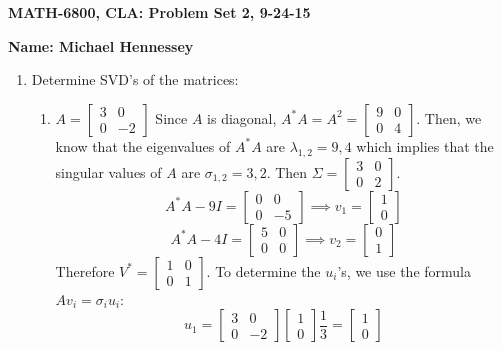 \documentclass[12pt]{article}
\numberwithin{equation}{section}
\begin{document}
{\large\bf MATH-6800, CLA: Problem Set 2, 9-24-15}



\vspace{6 ex}

{\bf Name: Michael Hennessey} \hfill

\vspace{6 ex}

\begin{enumerate}
\item Determine SVD's of the matrices:
    \begin{enumerate}
    \item $A=\left[\begin{array}{cc}3&0\\0&-2\end{array}\right]$
    Since $A$ is diagonal, $A^*A=A^2=\left[\begin{array}{cc}9&0\\0&4\end{array}\right]$. Then, we know that the eigenvalues of $A^*A$ are $\lambda_{1,2}=9,4$ which implies that the singular values of $A$ are $\sigma_{1,2}=3,2$. Then $\Sigma=\left[\begin{array}{cc}3&0\\0&2\end{array}\right]$.
    $$A^*A-9I=\left[\begin{array}{cc}0&0\\0&-5\end{array}\right]\implies v_1=\left[\begin{array}{c}1\\0\end{array}\right]$$
    $$A^*A-4I=\left[\begin{array}{cc}5&0\\0&0\end{array}\right]\implies v_2=\left[\begin{array}{c}0\\1\end{array}\right]$$
    Therefore $V^*=\left[\begin{array}{cc}1&0\\0&1\end{array}\right]$. To determine the $u_i$'s, we use the formula $Av_i=\sigma_iu_i$:
    $$u_1=\left[\begin{array}{cc}3&0\\0&-2\end{array}\right]\left[\begin{array}{c}1\\0\end{array}\right]\frac{1}{3}=\left[\begin{array}{c}1\\0\end{array}\right]$$

\end{enumerate}
\end{enumerate}
\end{document}
